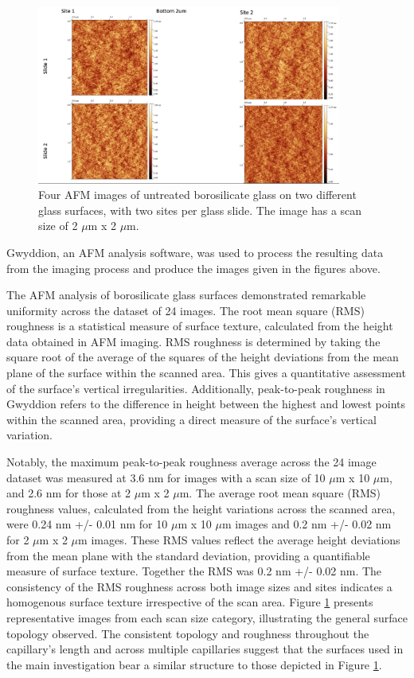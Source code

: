 \begin{figure}[h!!!!]     %
        \begin{center}
          \includegraphics[width=100mm]{chapter3/bot 2um.png}
\end{center}
\caption{Four AFM images of untreated borosilicate glass on two different glass surfaces, with two sites per glass slide. The image has a scan size of 2 $\mu$m x 2 $\mu$m.}
\label{fig:figure9}                 %
\end{figure}   

Gwyddion, an AFM analysis software, was used to process the resulting data from the imaging process and produce the images given in the figures above.\cite{gwy}

The AFM analysis of borosilicate glass surfaces demonstrated remarkable uniformity across the dataset of 24 images. The root mean square (RMS) roughness is a statistical measure of surface texture, calculated from the height data obtained in AFM imaging. RMS roughness is determined by taking the square root of the average of the squares of the height deviations from the mean plane of the surface within the scanned area. This gives a quantitative assessment of the surface's vertical irregularities. Additionally, peak-to-peak roughness in Gwyddion refers to the difference in height between the highest and lowest points within the scanned area, providing a direct measure of the surface's vertical variation.

Notably, the maximum peak-to-peak roughness average across the 24 image dataset was measured at 3.6 nm for images with a scan size of 10 $\mu$m x 10 $\mu$m, and 2.6 nm for those at 2 $\mu$m x 2 $\mu$m. The average root mean square (RMS) roughness values, calculated from the height variations across the scanned area, were 0.24 nm +/- 0.01 nm for 10 $\mu$m x 10 $\mu$m images and 0.2 nm +/- 0.02 nm for 2 $\mu$m x 2 $\mu$m images. These RMS values reflect the average height deviations from the mean plane with the standard deviation, providing a quantifiable measure of surface texture. Together the RMS was 0.2 nm +/- 0.02 nm. The consistency of the RMS roughness across both image sizes and sites indicates a homogenous surface texture irrespective of the scan area. Figure \ref{fig:figure9} presents representative images from each scan size category, illustrating the general surface topology observed. The consistent topology and roughness throughout the capillary's length and across multiple capillaries suggest that the surfaces used in the main investigation bear a similar structure to those depicted in Figure \ref{fig:figure9}.\cite{AFMbactPaper}
  

